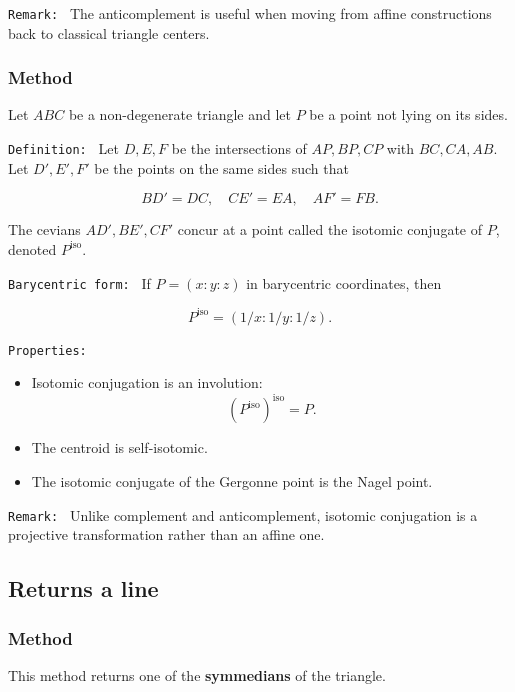 \texttt{Remark: }
The anticomplement is useful when moving from affine constructions back to classical triangle centers.


\subsubsection{Method }
\label{ssub:isotomic}


Let $ABC$ be a non-degenerate triangle and let $P$ be a point not lying on its sides.

\texttt{Definition: }
Let $D,E,F$ be the intersections of $AP,BP,CP$ with $BC,CA,AB$.
Let $D',E',F'$ be the points on the same sides such that

\[
BD'=DC,\quad CE'=EA,\quad AF'=FB.
\]

The cevians $AD',BE',CF'$ concur at a point called the isotomic conjugate of $P$, denoted $P^{\mathrm{iso}}$.

\texttt{Barycentric form: }
If $P=(x:y:z)$ in barycentric coordinates, then

\[
P^{\mathrm{iso}}=(1/x:1/y:1/z).
\]

\texttt{Properties: }
\begin{itemize}
\item Isotomic conjugation is an involution:
\[
(P^{\mathrm{iso}})^{\mathrm{iso}}=P.
\]
\item The centroid is self-isotomic.
\item The isotomic conjugate of the Gergonne point is the Nagel point.
\end{itemize}


\texttt{Remark: }
Unlike complement and anticomplement, isotomic conjugation is a projective transformation rather than an affine one.

\subsection{Returns  a line}
\subsubsection{Method }
\label{ssub:method_imeth_triangle_symmedian__line}

This method returns one of the \textbf{symmedians} of the triangle.

\medskip

